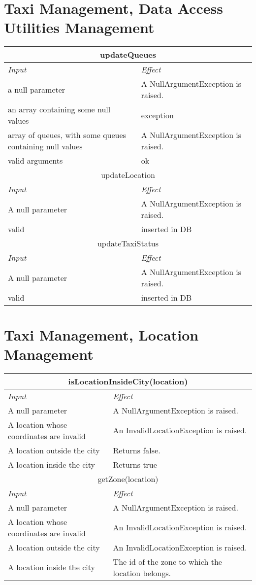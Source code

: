\documentclass[11pt,oneside,a4paper]{report}
\newcommand{\method}[1]{\multicolumn{2}{|c|}{{#1}}\\\hline
	\textit{Input} & \textit{Effect} \\\hline}
\begin{document}
\section{Taxi Management, Data Access Utilities Management}
\begin{tabular}{|p{5cm}|p{6cm}}
	\hline
	\method{updateQueues}
	a null parameter &
	A NullArgumentException is raised. \\\hline
	an array containing some null values &
	exception\\\hline
	array of queues, with some queues containing null values &
	A NullArgumentException is raised. \\\hline
	valid arguments &
	ok \\\hline\hline
	
	\method{updateLocation}
	A null parameter &
	A NullArgumentException is raised. \\\hline
	valid &
	inserted in DB \\\hline\hline
	
	\method{updateTaxiStatus}
	A null parameter &
	A NullArgumentException is raised. \\\hline
	valid &
	inserted in DB \\\hline
\end{tabular}


\section{Taxi Management, Location Management}
\begin{table}[ph]
\centering
\begin{tabular}{p{5cm}|p{6cm}}
	\hline
	\method{isLocationInsideCity(location)}
	A null parameter &
	A NullArgumentException is raised. \\\hline
	A location whose coordinates are invalid &
	An InvalidLocationException is raised. \\\hline
	A location outside the city &
	Returns false. \\\hline
	A location inside the city &
	Returns true \\\hline\hline
		
	\method{getZone(location)}
	A null parameter &
	A NullArgumentException is raised. \\\hline
	A location whose coordinates are invalid &
	An InvalidLocationException is raised. \\\hline
	A location outside the city &
	An InvalidLocationException is raised. \\\hline
	A location inside the city &
	The id of the zone to which the location belongs. \\\hline\hline
	
\end{tabular}
\end{table}
\end{document}
